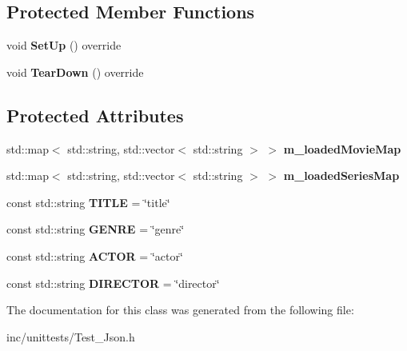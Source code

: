 \subsection*{Protected Member Functions}
\begin{DoxyCompactItemize}
\item 
\mbox{\label{classJsonTest_ae1bbf1b5b144a716ad8b4caefe799654}} 
void {\bfseries Set\+Up} () override
\item 
\mbox{\label{classJsonTest_adc7b6de10eb8ef1552ec09795a9b0769}} 
void {\bfseries Tear\+Down} () override
\end{DoxyCompactItemize}
\subsection*{Protected Attributes}
\begin{DoxyCompactItemize}
\item 
\mbox{\label{classJsonTest_a6e82eb046e59feedc8fcfc109217bf88}} 
std\+::map$<$ std\+::string, std\+::vector$<$ std\+::string $>$ $>$ {\bfseries m\+\_\+loaded\+Movie\+Map}
\item 
\mbox{\label{classJsonTest_aa3c7abcfb485941ad83f24253bc961d7}} 
std\+::map$<$ std\+::string, std\+::vector$<$ std\+::string $>$ $>$ {\bfseries m\+\_\+loaded\+Series\+Map}
\item 
\mbox{\label{classJsonTest_aa86a225b926154680154c0a884e30b8a}} 
const std\+::string {\bfseries T\+I\+T\+LE} = \char`\"{}title\char`\"{}
\item 
\mbox{\label{classJsonTest_ae09f5bfffe12fdd795c4d6d60c14368b}} 
const std\+::string {\bfseries G\+E\+N\+RE} = \char`\"{}genre\char`\"{}
\item 
\mbox{\label{classJsonTest_a7226a1a843bcd13ff167ec9d07783f81}} 
const std\+::string {\bfseries A\+C\+T\+OR} = \char`\"{}actor\char`\"{}
\item 
\mbox{\label{classJsonTest_a991fb6a3ee4f8511b4624334f47b1b56}} 
const std\+::string {\bfseries D\+I\+R\+E\+C\+T\+OR} = \char`\"{}director\char`\"{}
\end{DoxyCompactItemize}


The documentation for this class was generated from the following file\+:\begin{DoxyCompactItemize}
\item 
inc/unittests/Test\+\_\+\+Json.\+h\end{DoxyCompactItemize}
